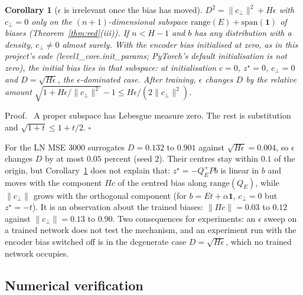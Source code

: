 \documentclass[11pt]{article}
\theoremstyle{plainnote}
\newtheorem{corollary}{Corollary}
\renewenvironment{proof}[1][Proof]{\par\noindent #1.\ }{\hfill$\square$\par}
\newcommand{\one}{\mathbf 1}
\newcommand{\cp}{c_\perp}
\begin{document}
\begin{corollary}[$\epsilon$ is irrelevant once the bias has moved]\label{cor:eps}
$D^2=\|\cp\|^2+H\epsilon$ with $\cp=0$ only on the $(n+1)$-dimensional subspace $\mathrm{range}(E)+\mathrm{span}(\one)$ of biases (Theorem~\ref{thm:red}(iii)). If $n<H-1$ and $b$ has any distribution with a density, $\cp\ne0$ almost surely. With the encoder bias initialised at zero, as in this project's code (level1\_core.init\_params; PyTorch's default initialisation is not zero), the initial bias lies in that subspace: at initialisation $c=0$, $z^\star=0$, $\cp=0$ and $D=\sqrt{H\epsilon}$, the $\epsilon$-dominated case. After training, $\epsilon$ changes $D$ by the relative amount $\sqrt{1+H\epsilon/\|\cp\|^2}-1\le H\epsilon/(2\|\cp\|^2)$.
\end{corollary}

\begin{proof}
A proper subspace has Lebesgue measure zero. The rest is substitution and $\sqrt{1+t}\le1+t/2$.
\end{proof}

For the LN MSE 3000 surrogates $D=0.132$ to $0.901$ against $\sqrt{H\epsilon}=0.004$, so $\epsilon$ changes $D$ by at most $0.05$ percent (seed 2). Their centres stay within $0.1$ of the origin, but Corollary~\ref{cor:eps} does not explain that: $z^\star=-Q_E^+Pb$ is linear in $b$ and moves with the component $\Pi c$ of the centred bias along $\mathrm{range}(Q_E)$, while $\|\cp\|$ grows with the orthogonal component (for $b=Et+\alpha\one$, $\cp=0$ but $z^\star=-t$). It is an observation about the trained biases: $\|\Pi c\|=0.03$ to $0.12$ against $\|\cp\|=0.13$ to $0.90$. Two consequences for experiments: an $\epsilon$ sweep on a trained network does not test the mechanism, and an experiment run with the encoder bias switched off is in the degenerate case $D=\sqrt{H\epsilon}$, which no trained network occupies.

\subsection{Numerical verification}\label{sec:verify1}
\end{document}
